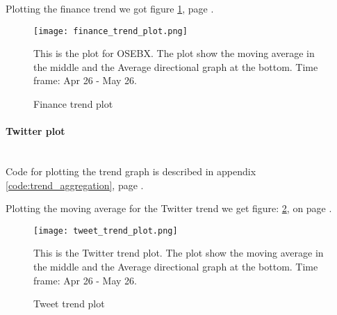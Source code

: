 Plotting the finance trend we got figure \ref{fig:trend_finance_plot}, page
\pageref{fig:trend_finance_plot}.
\begin{figure}[htb]
    \centering
    \texttt{[image: finance\_trend\_plot.png]}
    \label{fig:trend_finance_plot}
    \caption{Finance trend plot}
This is the plot for OSEBX. The plot show the moving average in the middle and
the Average directional graph at the bottom. Time frame: Apr 26 - May 26. 
\end{figure}


\paragraph{Twitter plot}
\hspace{0pt}\\
Code for plotting the trend graph is described in appendix
\ref{code:trend_aggregation}, page \pageref{code:trend_aggregation}.

Plotting the moving average for the Twitter trend we get figure:
\ref{fig:trend_tweet_plot}, on page
\pageref{fig:trend_tweet_plot}.

\begin{figure}[htb]
    \texttt{[image: tweet\_trend\_plot.png]}
    \label{fig:trend_tweet_plot}
    \caption{Tweet trend plot}
This is the Twitter trend plot. The plot show the moving average in the middle
and the Average directional graph at the bottom. Time frame: Apr 26 - May 26.
\end{figure}
%

